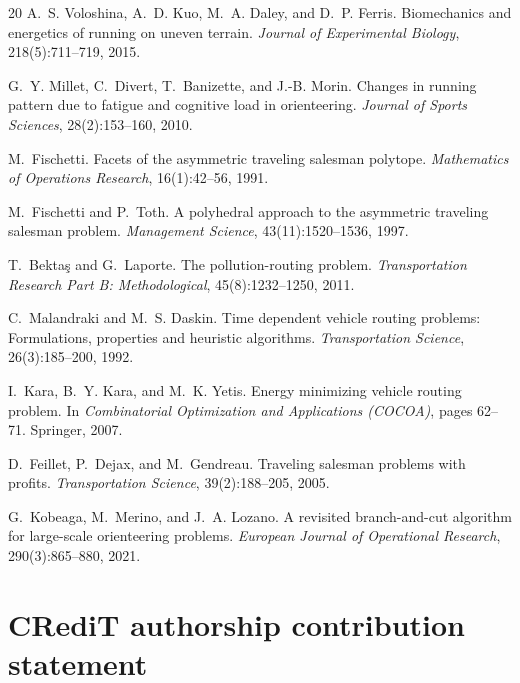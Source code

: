 \documentclass[preprint,11pt]{elsarticle}
\begin{document}
\begin{thebibliography}{20}
A.~S. Voloshina, A.~D. Kuo, M.~A. Daley, and D.~P. Ferris.
\newblock Biomechanics and energetics of running on uneven terrain.
\newblock \emph{Journal of Experimental Biology}, 218(5):711--719, 2015.

G.~Y. Millet, C.~Divert, T.~Banizette, and J.-B. Morin.
\newblock Changes in running pattern due to fatigue and cognitive load in orienteering.
\newblock \emph{Journal of Sports Sciences}, 28(2):153--160, 2010.

M.~Fischetti.
\newblock Facets of the asymmetric traveling salesman polytope.
\newblock \emph{Mathematics of Operations Research}, 16(1):42--56, 1991.

M.~Fischetti and P.~Toth.
\newblock A polyhedral approach to the asymmetric traveling salesman problem.
\newblock \emph{Management Science}, 43(11):1520--1536, 1997.

T.~Bekta\c{s} and G.~Laporte.
\newblock The pollution-routing problem.
\newblock \emph{Transportation Research Part B: Methodological}, 45(8):1232--1250, 2011.

C.~Malandraki and M.~S. Daskin.
\newblock Time dependent vehicle routing problems: Formulations, properties and heuristic algorithms.
\newblock \emph{Transportation Science}, 26(3):185--200, 1992.

I.~Kara, B.~Y. Kara, and M.~K. Yetis.
\newblock Energy minimizing vehicle routing problem.
\newblock In \emph{Combinatorial Optimization and Applications (COCOA)}, pages 62--71. Springer, 2007.

D.~Feillet, P.~Dejax, and M.~Gendreau.
\newblock Traveling salesman problems with profits.
\newblock \emph{Transportation Science}, 39(2):188--205, 2005.

G.~Kobeaga, M.~Merino, and J.~A. Lozano.
\newblock A revisited branch-and-cut algorithm for large-scale orienteering problems.
\newblock \emph{European Journal of Operational Research}, 290(3):865--880, 2021.

\end{thebibliography}

\section*{CRediT authorship contribution statement}
\end{document}
